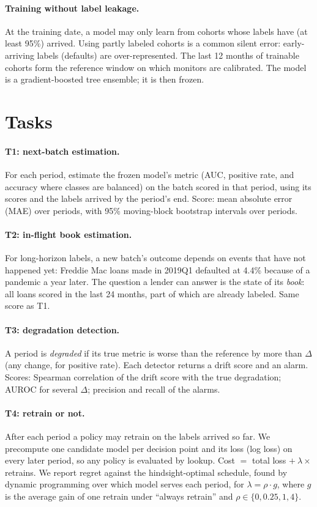 \documentclass[11pt]{article}
\begin{document}
\paragraph{Training without label leakage.} At the training date, a model may only learn from
cohorts whose labels have (at least 95\%) arrived. Using partly labeled cohorts is a common
silent error: early-arriving labels (defaults) are over-represented. The last 12 months of
trainable cohorts form the reference window on which monitors are calibrated. The model is a
gradient-boosted tree ensemble; it is then frozen.

\section{Tasks}\label{sec:tasks}

\paragraph{T1: next-batch estimation.} For each period, estimate the frozen model's metric
(AUC, positive rate, and accuracy where classes are balanced) on the batch scored in that
period, using its scores and the labels arrived by the period's end. Score: mean absolute error
(MAE) over periods, with 95\% moving-block bootstrap intervals over periods.

\paragraph{T2: in-flight book estimation.} For long-horizon labels, a new batch's outcome
depends on events that have not happened yet: Freddie Mac loans made in 2019Q1 defaulted at
4.4\% because of a pandemic a year later. The question a lender can answer is the state of its
\emph{book}: all loans scored in the last 24 months, part of which are already labeled.
Same score as T1.

\paragraph{T3: degradation detection.} A period is \emph{degraded} if its true metric is
worse than the reference by more than $\Delta$ (any change, for positive rate). Each detector
returns a drift score and an alarm. Scores: Spearman correlation of the drift score with the
true degradation; AUROC for several $\Delta$; precision and recall of the alarms.

\paragraph{T4: retrain or not.} After each period a policy may retrain on the labels arrived
so far. We precompute one candidate model per decision point and its loss (log loss) on every
later period, so any policy is evaluated by lookup. Cost $=$ total loss $+\ \lambda \times$
retrains. We report regret against the hindsight-optimal schedule, found by dynamic
programming over which model serves each period, for $\lambda = \rho \cdot g$, where $g$ is the
average gain of one retrain under ``always retrain'' and $\rho \in \{0, 0.25, 1, 4\}$.
\end{document}
